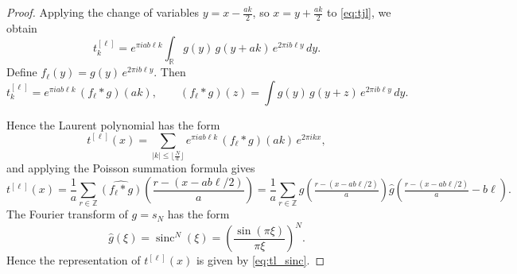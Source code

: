 \documentclass{article}
\DeclareMathOperator{\sinc}{sinc}
\begin{document}
  \begin{proof}  

Applying the change of variables \(y = x - \tfrac{a k}{2}\), so \(x = y + \tfrac{a k}{2}\) to \eqref{eq:tjl}, we obtain
\begin{equation*}
t^{[\ell]}_k 
= e^{\pi i a b \ell k}
  \int_{\mathbb{R}} g(y)\, g(y + a k)\, e^{2\pi i b \ell y}\,dy.
\end{equation*}
Define \(f_\ell(y) = g(y)\,e^{2\pi i b \ell y}\).
Then
\begin{equation*}
t^{[\ell]}_k 
= e^{\pi i a b \ell k}\, (f_\ell * g)(a k),
\qquad 
(f_\ell * g)(z) = \int g(y)\, g(y+z)\, e^{2\pi i b \ell y}\,dy.
\end{equation*}

Hence the Laurent polynomial has the form
\begin{equation*}
t^{[\ell]}(x)
= \sum_{|k|\leq \lfloor \frac{N}{a} \rfloor} e^{\pi i a b \ell k}\, (f_\ell * g)(a k)\, e^{2\pi i k x},
\end{equation*}
and applying the Poisson summation formula gives
\begin{equation*}
t^{[\ell]}(x)
= \frac{1}{a}\sum_{r\in\mathbb{Z}}
  \widehat{(f_\ell * g)}\!\left(\frac{r - (x - a b \ell/2)}{a}\right)= \frac{1}{a}\sum_{r\in\mathbb{Z}}
   \widehat{g}\!\left(\tfrac{r - (x - a b \ell/2)}{a}\right)
   \widehat{g}\!\left(\tfrac{r - (x - a b \ell/2)}{a} - b\ell\right).
\end{equation*}
The Fourier transform of $g=s_N$ has the form
\begin{equation*}
\widehat{g}(\xi)
= \sinc^N(\xi)
= \left(\frac{\sin(\pi \xi)}{\pi \xi}\right)^N.
\end{equation*}
Hence the representation of $t^{[\ell]}(x)$ is given by
\eqref{eq:tl_sinc}. 

\end{proof}
\end{document}
